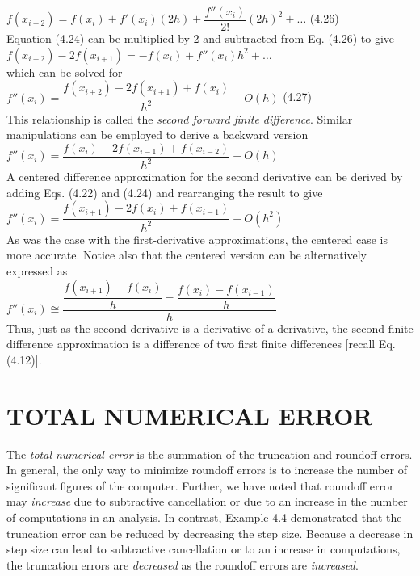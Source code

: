 \documentclass[../main.tex]{subfiles}
\begin{document}
$f(x_{i+2})= f(x_i)+f'(x_i)(2h)+\dfrac{f''(x_i)}{2!}(2h)^2+\hdots$
\hfill
(4.26)\\

\noindent
Equation (4.24) can be multiplied by 2 and subtracted from Eq. (4.26) to give\\

$f(x_{i+2})-2f(x_{i+1})= -f(x_i)+f''(x_i)h^2+\hdots$\\

\noindent
which can be solved for\\

$f''(x_i)=\dfrac{f(x_{i+2})-2f(x_{i+1})+f(x_i)}{h^2}+O(h)$
\hfill
(4.27)\\

\noindent
This relationship is called the \emph{second forward finite difference}. Similar manipulations can
be employed to derive a backward version\\

$f''(x_i)=\dfrac{f(x_i)-2f(x_{i-1})+f(x_{i-2})}{h^2}+ O(h)$\\

\noindent
A centered difference approximation for the second derivative can be derived by
adding Eqs. (4.22) and (4.24) and rearranging the result to give\\

$f''(x_i)=\dfrac{f(x_{i+1})-2f(x_{i})+f(x_{i-1})}{h^2}+ O(h^2)$\\

\noindent
As was the case with the first-derivative approximations, the centered case is more accurate.
Notice also that the centered version can be alternatively expressed as\\

$f''(x_i)\cong \dfrac{\dfrac{f(x_{i+1})-f(x_i)}{h} - \dfrac{f(x_{i})-f(x_{i-1})}{h}}{h}$\\

\noindent
Thus, just as the second derivative is a derivative of a derivative, the second finite difference
approximation is a difference of two first finite differences [recall Eq. (4.12)].\\

\bigskip
\section[TOTAL NUMERICAL ERROR]{TOTAL NUMERICAL ERROR}

\noindent
The \emph{total numerical error} is the summation of the truncation and roundoff errors. In general,
the only way to minimize roundoff errors is to increase the number of significant figures
of the computer. Further, we have noted that roundoff error may \emph{increase} due to subtractive
cancellation or due to an increase in the number of computations in an analysis. In contrast,
Example 4.4 demonstrated that the truncation error can be reduced by decreasing the step
size. Because a decrease in step size can lead to subtractive cancellation or to an increase in
computations, the truncation errors are \emph{decreased} as the roundoff errors are \emph{increased}.\\
\end{document}
